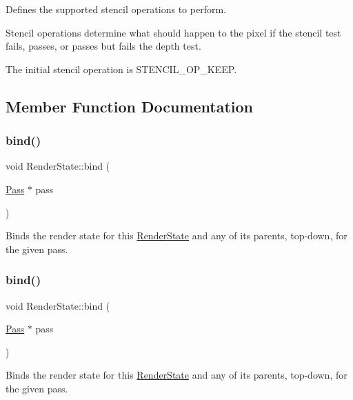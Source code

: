 Defines the supported stencil operations to perform.

Stencil operations determine what should happen to the pixel if the stencil test fails, passes, or passes but fails the depth test.

The initial stencil operation is S\+T\+E\+N\+C\+I\+L\+\_\+\+O\+P\+\_\+\+K\+E\+EP. 

\subsection{Member Function Documentation}
\mbox{\label{classRenderState_a2b509af29faeef89bab4f7afcc7cfbd0}} 
\subsubsection{\texorpdfstring{bind()}{bind()}\hspace{0.1cm}{\footnotesize\ttfamily [1/2]}}
{\footnotesize\ttfamily void Render\+State\+::bind (\begin{DoxyParamCaption}\item[{\hyperlink{classPass}{Pass} $\ast$}]{pass }\end{DoxyParamCaption})}

Binds the render state for this \hyperlink{classRenderState}{Render\+State} and any of its parents, top-\/down, for the given pass. \mbox{\label{classRenderState_a2b509af29faeef89bab4f7afcc7cfbd0}} 
\subsubsection{\texorpdfstring{bind()}{bind()}\hspace{0.1cm}{\footnotesize\ttfamily [2/2]}}
{\footnotesize\ttfamily void Render\+State\+::bind (\begin{DoxyParamCaption}\item[{\hyperlink{classPass}{Pass} $\ast$}]{pass }\end{DoxyParamCaption})}

Binds the render state for this \hyperlink{classRenderState}{Render\+State} and any of its parents, top-\/down, for the given pass. \mbox{\label{classRenderState_a20cd68c30ab9e3fb5e763a52177cb1f6}} 
